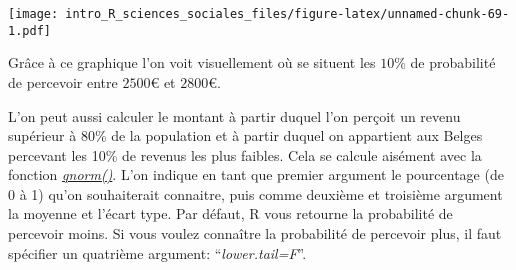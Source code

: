 \documentclass[
]{book}
\newenvironment{Shaded}{\begin{snugshade}}{\end{snugshade}}
\newcommand{\AttributeTok}[1]{\textcolor[rgb]{0.77,0.63,0.00}{#1}}
\newcommand{\ConstantTok}[1]{\textcolor[rgb]{0.00,0.00,0.00}{#1}}
\newcommand{\DecValTok}[1]{\textcolor[rgb]{0.00,0.00,0.81}{#1}}
\newcommand{\FloatTok}[1]{\textcolor[rgb]{0.00,0.00,0.81}{#1}}
\newcommand{\FunctionTok}[1]{\textcolor[rgb]{0.00,0.00,0.00}{#1}}
\newcommand{\NormalTok}[1]{#1}
\newcommand{\OtherTok}[1]{\textcolor[rgb]{0.56,0.35,0.01}{#1}}
\newcommand{\SpecialCharTok}[1]{\textcolor[rgb]{0.00,0.00,0.00}{#1}}
\newcommand{\StringTok}[1]{\textcolor[rgb]{0.31,0.60,0.02}{#1}}
\begin{document}
\begin{Shaded}
\end{Shaded}

\texttt{[image: intro\_R\_sciences\_sociales\_files/figure-latex/unnamed-chunk-69-1.pdf]}

Grâce à ce graphique l'on voit visuellement où se situent les \(10\%\) de probabilité de percevoir entre \(2500€\) et \(2800€\).

L'on peut aussi calculer le montant à partir duquel l'on perçoit un revenu supérieur à 80\% de la population et à partir duquel on appartient aux Belges percevant les 10\% de revenus les plus faibles. Cela se calcule aisément avec la fonction \href{https://www.rdocumentation.org/packages/stats/versions/3.6.2/topics/Normal}{\emph{qnorm()}}. L'on indique en tant que premier argument le pourcentage (de 0 à 1) qu'on souhaiterait connaitre, puis comme deuxième et troisième argument la moyenne et l'écart type. Par défaut, R vous retourne la probabilité de percevoir moins. Si vous voulez connaître la probabilité de percevoir plus, il faut spécifier un quatrième argument: ``\emph{lower.tail=F}''.
\end{document}
